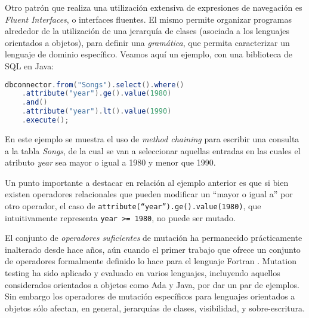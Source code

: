 Otro patr\'on que realiza una utilizaci\'on extensiva de expresiones de navegaci\'on es \emph{Fluent Interfaces}, o interfaces fluentes. El mismo permite organizar programas alrededor de la utilizaci\'on de una jerarqu\'ia de clases (asociada a los lenguajes orientados a objetos), para definir una \emph{gram\'atica}, que permita caracterizar un lenguaje de dominio espec\'ifico. Veamos aqu\'i un ejemplo, con una biblioteca de SQL en Java:
\begin{center}
	\begin{lstlisting}[mathescape=true, language=Java]
	dbconnector.from("Songs").select().where()
	.attribute("year").ge().value(1980)
	.and()
	.attribute("year").lt().value(1990)
	.execute();
	\end{lstlisting}
\end{center}
En este ejemplo se muestra el uso de \emph{method chaining} para escribir una consulta a la tabla \emph{Songs}, de la cual se van a seleccionar aquellas entradas en las cuales el atributo \emph{year} sea mayor o igual a 1980 y menor que 1990.

Un punto importante a destacar en relaci\'on al ejemplo anterior es que si bien existen operadores relacionales que pueden modificar un ``mayor o igual a'' por otro operador, el caso de \texttt{attribute(``year'').ge().value(1980)}, que intuitivamente representa \texttt{year >= 1980}, no puede ser mutado.

El conjunto de \emph{operadores suficientes} de mutaci\'on ha permanecido pr\'acticamente inalterado desde hace a\~nos, a\'un cuando el primer trabajo que ofrece un conjunto de operadores formalmente definido lo hace para el lenguaje Fortran \cite{bibliography.mutation.definitions.fortranOffut87, bibliography.mutation.definitions.fortranKing91}. Mutation testing ha sido aplicado y evaluado en varios lenguajes, incluyendo aquellos considerados orientados a objetos como Ada y Java, por dar un par de ejemplos. Sin embargo los operadores de mutaci\'on espec\'ificos para lenguajes orientados a objetos s\'olo afectan, en general, jerarqu\'ias de clases, visibilidad, y sobre-escritura. 


